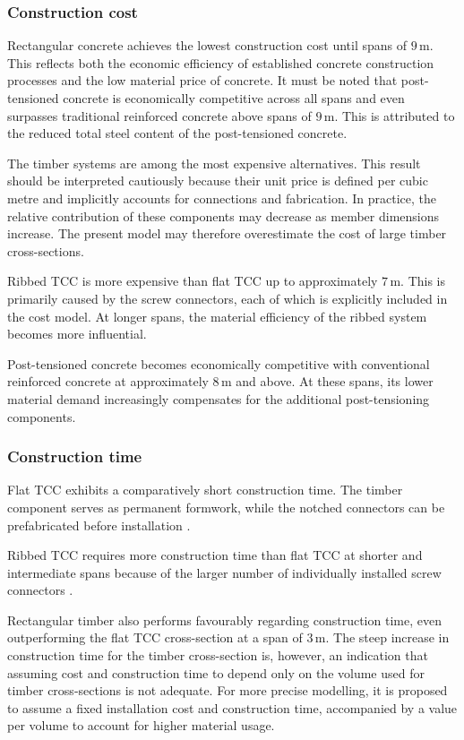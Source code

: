 \subsubsection{Construction cost}
Rectangular concrete achieves the lowest construction cost until spans of \(9\,\mathrm{m}\). This reflects both the economic efficiency of established concrete construction processes and the low material price of concrete. It must be noted that post-tensioned concrete is economically competitive across all spans and even surpasses traditional reinforced concrete above spans of \(9\,\mathrm{m}\). This is attributed to the reduced total steel content of the post-tensioned concrete.

The timber systems are among the most expensive alternatives. This result should be interpreted cautiously because their unit price is defined per cubic metre and implicitly accounts for connections and fabrication. In practice, the relative contribution of these components may decrease as member dimensions increase. The present model may therefore overestimate the cost of large timber cross-sections.

Ribbed TCC is more expensive than flat TCC up to approximately \(7\,\mathrm{m}\). This is primarily caused by the screw connectors, each of which is explicitly included in the cost model. At longer spans, the material efficiency of the ribbed system becomes more influential.

Post-tensioned concrete becomes economically competitive with conventional reinforced concrete at approximately \(8\,\mathrm{m}\) and above. At these spans, its lower material demand increasingly compensates for the additional post-tensioning components.

\subsubsection{Construction time}
Flat TCC exhibits a comparatively short construction time. The timber component serves as permanent formwork, while the notched connectors can be prefabricated before installation \cite{Morkoetter2021_HBVDecken}.

Ribbed TCC requires more construction time than flat TCC at shorter and intermediate spans because of the larger number of individually installed screw connectors \cite{Morkoetter2021_HBVDecken, Wuerth2021_HolzBetonVerbund}.

Rectangular timber also performs favourably regarding construction time, even outperforming the flat TCC cross-section at a span of \(3\,\mathrm{m}\). The steep increase in construction time for the timber cross-section is, however, an indication that assuming cost and construction time to depend only on the volume used for timber cross-sections is not adequate. For more precise modelling, it is proposed to assume a fixed installation cost and construction time, accompanied by a value per volume to account for higher material usage.

